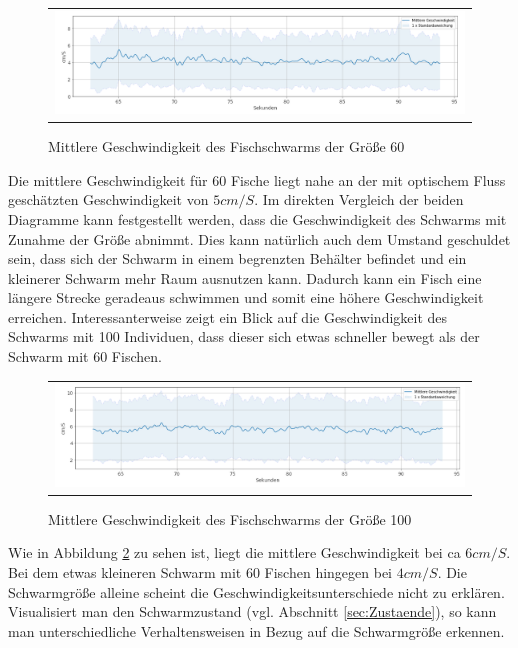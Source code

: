 \begin{figure}[H]
\centering
\begin{tabular}{l}
\includegraphics[width=1.0\textwidth]{figures/Experimente/Tracking/geschw_60F.png} 
\end{tabular}
\caption{ Mittlere Geschwindigkeit des Fischschwarms der Größe 60} \label{fig:geschw_60}
\end{figure}

Die mittlere Geschwindigkeit für 60 Fische liegt nahe an der mit optischem Fluss geschätzten Geschwindigkeit von $5 cm/S$. Im direkten Vergleich der beiden Diagramme kann festgestellt werden, dass die Geschwindigkeit des Schwarms mit Zunahme der Größe abnimmt. Dies kann natürlich auch dem Umstand geschuldet sein, dass sich der Schwarm in einem begrenzten Behälter befindet und ein kleinerer Schwarm mehr Raum ausnutzen kann. Dadurch kann ein Fisch eine längere Strecke geradeaus schwimmen und somit eine höhere Geschwindigkeit erreichen. Interessanterweise zeigt ein Blick auf die Geschwindigkeit des Schwarms mit 100 Individuen, dass dieser sich etwas schneller bewegt als der Schwarm mit 60 Fischen.

\begin{figure}[H]
\centering
\begin{tabular}{l}
\includegraphics[width=1.0\textwidth]{figures/Experimente/Tracking/geschw_100F.png} 
\end{tabular}
\caption{ Mittlere Geschwindigkeit des Fischschwarms der Größe 100} \label{fig:geschw_100}
\end{figure}

Wie in Abbildung \ref{fig:geschw_100} zu sehen ist, liegt die mittlere Geschwindigkeit bei ca $6cm/S$.
Bei dem etwas kleineren Schwarm mit 60 Fischen hingegen bei $4cm/S$. 
Die Schwarmgröße alleine scheint die Geschwindigkeitsunterschiede nicht zu erklären.
Visualisiert man den Schwarmzustand (vgl. Abschnitt \ref{sec:Zustaende}), so kann man unterschiedliche Verhaltensweisen in Bezug auf die Schwarmgröße erkennen.

